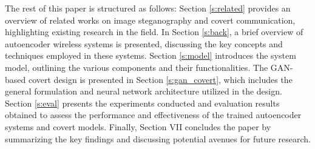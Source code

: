 The rest of this paper is structured as follows: Section \ref{s:related} provides an overview of related works on image steganography and covert communication, highlighting existing research in the field. In Section \ref{s:back}, a brief overview of autoencoder wireless systems is presented, discussing the key concepts and techniques employed in these systems. Section \ref{s:model} introduces the system model, outlining the various components and their functionalities. The GAN-based covert design is presented in Section \ref{s:gan_covert}, which includes the general formulation and neural network architecture utilized in the design. Section \ref{s:eval} presents the experiments conducted and evaluation results obtained to assess the performance and effectiveness of the trained autoencoder systems and covert models. Finally, Section VII concludes the paper by summarizing the key findings and discussing potential avenues for future research.
